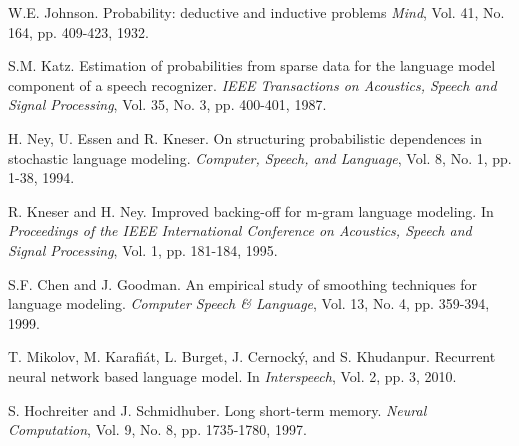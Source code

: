 \documentclass[a4paper, 12pt]{article}
\newcommand{\tit}[1]{\textit{#1}}
\begin{document}
\begin{thebibliography}{99}

	W.E. Johnson. Probability: deductive and inductive problems
	\tit{Mind}, Vol. 41, No. 164, pp. 409-423, 1932.
	
	S.M. Katz. Estimation of probabilities from sparse data for the language model component of a speech recognizer. \tit{IEEE Transactions on Acoustics, Speech and Signal Processing}, Vol. 35, No. 3, pp. 400-401, 1987.
	
	H. Ney, U. Essen and R. Kneser. On structuring probabilistic dependences in stochastic language modeling. \tit{Computer, Speech, and Language}, Vol. 8, No. 1, pp. 1-38, 1994.   
	
	R. Kneser and H. Ney. Improved backing-off for m-gram language modeling. In \tit{Proceedings of the IEEE International Conference on Acoustics, Speech and Signal Processing}, Vol. 1, pp. 181-184, 1995.

	S.F. Chen and J. Goodman. An empirical study of smoothing techniques for language modeling. \tit{Computer Speech \& Language}, Vol. 13, No. 4, pp. 359-394, 1999.

	T. Mikolov, M. Karafi\'{a}t, L. Burget, J. Cernock\'{y}, and S. Khudanpur. Recurrent neural network based language model. In \tit{Interspeech}, Vol. 2, pp. 3, 2010.
	
	S. Hochreiter and J. Schmidhuber. Long short-term memory. \tit{Neural Computation}, Vol. 9, No. 8, pp. 1735-1780, 1997.

\end{thebibliography}
\end{document}
